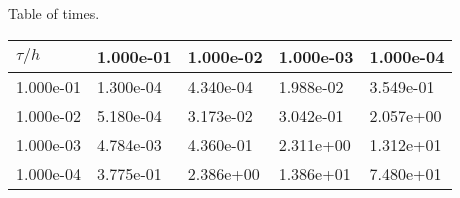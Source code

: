 \begin{center}
Table of times.
  
\begin{tabular}{|p{1in}|p{1in}|p{1in}|p{1in}|p{1in}|} \hline
$\tau / h$ &1.000e-01 &1.000e-02 &1.000e-03 &1.000e-04 \\ \hline 
1.000e-01 &1.300e-04 &4.340e-04 &1.988e-02 &3.549e-01 \\ \hline 
1.000e-02 &5.180e-04 &3.173e-02 &3.042e-01 &2.057e+00 \\ \hline 
1.000e-03 &4.784e-03 &4.360e-01 &2.311e+00 &1.312e+01 \\ \hline 
1.000e-04 &3.775e-01 &2.386e+00 &1.386e+01 &7.480e+01 \\ \hline 

\end{tabular}\\[20pt]
\end{center}
